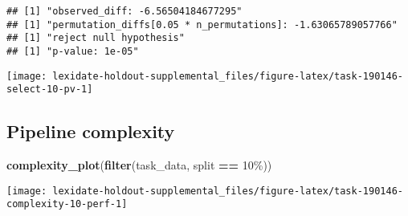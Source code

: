 \documentclass[
]{book}
\newenvironment{Shaded}{\begin{snugshade}}{\end{snugshade}}
\newcommand{\AttributeTok}[1]{\textcolor[rgb]{0.13,0.29,0.53}{#1}}
\newcommand{\DecValTok}[1]{\textcolor[rgb]{0.00,0.00,0.81}{#1}}
\newcommand{\FunctionTok}[1]{\textcolor[rgb]{0.13,0.29,0.53}{\textbf{#1}}}
\newcommand{\NormalTok}[1]{#1}
\newcommand{\OtherTok}[1]{\textcolor[rgb]{0.56,0.35,0.01}{#1}}
\newcommand{\SpecialCharTok}[1]{\textcolor[rgb]{0.81,0.36,0.00}{\textbf{#1}}}
\newcommand{\StringTok}[1]{\textcolor[rgb]{0.31,0.60,0.02}{#1}}
\begin{document}
\begin{Shaded}
\end{Shaded}

\begin{verbatim}
## [1] "observed_diff: -6.56504184677295"
## [1] "permutation_diffs[0.05 * n_permutations]: -1.63065789057766"
## [1] "reject null hypothesis"
## [1] "p-value: 1e-05"
\end{verbatim}

\texttt{[image: lexidate-holdout-supplemental\_files/figure-latex/task-190146-select-10-pv-1]}

\hypertarget{pipeline-complexity-15}{%
\subsection{Pipeline complexity}\label{pipeline-complexity-15}}

\begin{Shaded}
\begin{Highlighting}[]
\FunctionTok{complexity\_plot}\NormalTok{(}\FunctionTok{filter}\NormalTok{(task\_data, split }\SpecialCharTok{==} \StringTok{\textquotesingle{}10\%\textquotesingle{}}\NormalTok{))}
\end{Highlighting}
\end{Shaded}

\texttt{[image: lexidate-holdout-supplemental\_files/figure-latex/task-190146-complexity-10-perf-1]}
\end{document}
